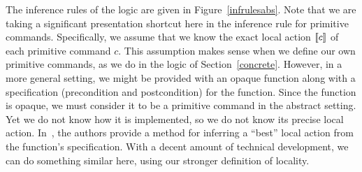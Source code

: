The inference rules of the logic are given in Figure~\ref{infrulesabs}. Note that we are taking a significant presentation shortcut 
here in the inference rule for primitive commands. Specifically, we assume that we know the exact local action $\llbracket c \rrbracket$ of each 
primitive command $c$. This assumption makes sense when we define our own primitive commands, as we do in the
logic of Section~\ref{concrete}. However, in a more general setting, we might be provided with an opaque function
along with a specification (precondition and postcondition) for the function. Since the function is opaque, we must
consider it to be a primitive command in the abstract setting. Yet we do not know how it is implemented, so we do not know 
its precise local action. In~\cite{coy07}, the authors provide a method for inferring a ``best'' local action
from the function's specification. With a decent amount of technical development, we can do something similar here,
using our stronger definition of locality. 
